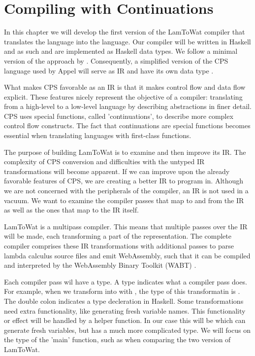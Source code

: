 
\chapter{\label{chap:cpscomp}Compiling with Continuations}

In this chapter we will develop the first version of the LamToWat compiler that translates the  language into the  language. Our compiler will be written in Haskell \autocite{haskellhomepage} and as such  and  are implemented as Haskell data types. We follow a minimal version of the approach by \citeauthor{DBLP:books/daglib/0022396} \autocite{DBLP:books/daglib/0022396}. Consequently, a simplified version of the CPS language used by Appel will serve as IR and have its own data type . 

What makes CPS favorable as an IR is that it makes control flow and data flow explicit. These features nicely represent the objective of a compiler: translating from a high-level to a low-level language by describing abstractions in finer detail. CPS uses special functions, called 'continuations', to describe more complex control flow constructs. The fact that continuations are special functions becomes essential when translating languages with first-class functions.

The purpose of building LamToWat is to examine and then improve its IR. The complexity of CPS conversion and difficulties with the untyped IR transformations will become apparent. If we can improve upon the already favorable features of CPS, we are creating a better IR to program in. Although we are not concerned with the peripherals of the compiler, an IR is not used in a vacuum. We want to examine the compiler passes that map to and from the IR as well as the ones that map to the IR itself.

LamToWat is a multipass compiler. This means that multiple passes over the IR will be made, each transforming a part of the representation. The complete compiler comprises these IR transformations with additional passes to parse lambda calculus source files and emit WebAssembly, such that it can be compiled and interpreted by the WebAssembly Binary Toolkit (WABT) \autocite{wabt}.

Each compiler pass wil have a type. A type indicates what a compiler pass does. For example, when we transform  into  with , the type of this transformatin is . The double colon indicates a type decleration in Haskell. Some transformations need extra functionality, like generating fresh variable names. This functionality or effect will be handled by a helper function. In our case this will be  which can generate fresh variables, but has a much more complicated type. We will focus on the type of the 'main' function, such as  when comparing the two version of LamToWat.

